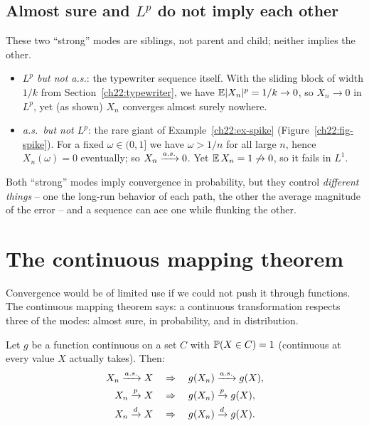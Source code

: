 \subsection{Almost sure and \texorpdfstring{$L^p$}{Lp} do not imply each other}
\label{ch22:as-vs-lp}

These two ``strong'' modes are siblings, not parent and child; neither implies the
other.

\begin{itemize}
\item \emph{$L^p$ but not a.s.}: the typewriter sequence itself. With the sliding
      block of width $1/k$ from Section~\ref{ch22:typewriter}, we have
      $\E\abs{X_n}^p = 1/k \to 0$, so $X_n\to0$ in $L^p$, yet (as shown) $X_n$
      converges almost surely nowhere.
\item \emph{a.s.\ but not $L^p$}: the rare giant of Example~\ref{ch22:ex-spike}
      (Figure~\ref{ch22:fig-spike}). For a
      fixed $\omega\in(0,1]$ we have $\omega>1/n$ for all large $n$, hence
      $X_n(\omega)=0$ eventually; so $X_n\asto0$. Yet $\E X_n = 1\not\to0$, so it
      fails in $L^1$.
\end{itemize}

Both ``strong'' modes imply convergence in probability, but they control \emph{different
things} -- one the long-run behavior of each path, the other the average magnitude of
the error -- and a sequence can ace one while flunking the other.

\section{The continuous mapping theorem}
\label{ch22:cmt}

Convergence would be of limited use if we could not push it through functions. The continuous mapping theorem says: a continuous transformation respects three of the modes: almost sure, in probability, and in distribution.

\begin{theorem}
\label{ch22:thm-cmt}
Let $g$ be a function continuous on a set $C$ with $\P(X\in C)=1$ (continuous at every
value $X$ actually takes). Then:
\begin{align*}
  X_n\asto X \quad&\Rightarrow\quad g(X_n)\asto g(X),\\
  X_n\pto X \quad&\Rightarrow\quad g(X_n)\pto g(X),\\
  X_n\dto X \quad&\Rightarrow\quad g(X_n)\dto g(X).
\end{align*}
\end{theorem}

